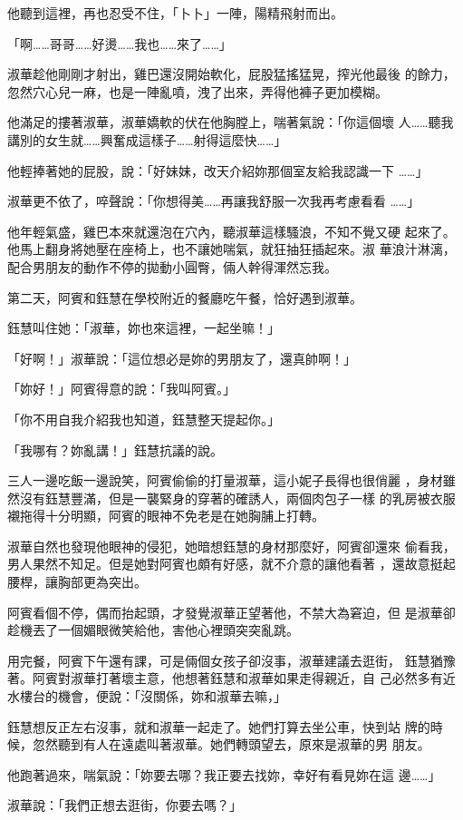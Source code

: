 他聽到這裡，再也忍受不住，「卜卜」一陣，陽精飛射而出。

「啊……哥哥……好燙……我也……來了……」

淑華趁他剛剛才射出，雞巴還沒開始軟化，屁股猛搖猛晃，搾光他最後
的餘力，忽然穴心兒一麻，也是一陣亂噴，洩了出來，弄得他褲子更加模糊。

他滿足的摟著淑華，淑華嬌軟的伏在他胸膛上，喘著氣說：「你這個壞
人……聽我講別的女生就……興奮成這樣子……射得這麼快……」

他輕捧著她的屁股，說：「好妹妹，改天介紹妳那個室友給我認識一下
……」

淑華更不依了，啐聲說：「你想得美……再讓我舒服一次我再考慮看看
……」

他年輕氣盛，雞巴本來就還泡在穴內，聽淑華這樣騷浪，不知不覺又硬
起來了。他馬上翻身將她壓在座椅上，也不讓她喘氣，就狂抽狂插起來。淑
華浪汁淋漓，配合男朋友的動作不停的拋動小圓臀，倆人幹得渾然忘我。

第二天，阿賓和鈺慧在學校附近的餐廳吃午餐，恰好遇到淑華。

鈺慧叫住她：「淑華，妳也來這裡，一起坐嘛！」

「好啊！」淑華說：「這位想必是妳的男朋友了，還真帥啊！」

「妳好！」阿賓得意的說：「我叫阿賓。」

「你不用自我介紹我也知道，鈺慧整天提起你。」

「我哪有？妳亂講！」鈺慧抗議的說。

三人一邊吃飯一邊說笑，阿賓偷偷的打量淑華，這小妮子長得也很俏麗
，身材雖然沒有鈺慧豐滿，但是一襲緊身的穿著的確誘人，兩個肉包子一樣
的乳房被衣服襯拖得十分明顯，阿賓的眼神不免老是在她胸脯上打轉。

淑華自然也發現他眼神的侵犯，她暗想鈺慧的身材那麼好，阿賓卻還來
偷看我，男人果然不知足。但是她對阿賓也頗有好感，就不介意的讓他看著
，還故意挺起腰桿，讓胸部更為突出。

阿賓看個不停，偶而抬起頭，才發覺淑華正望著他，不禁大為窘迫，但
是淑華卻趁機丟了一個媚眼微笑給他，害他心裡頭突突亂跳。

用完餐，阿賓下午還有課，可是倆個女孩子卻沒事，淑華建議去逛街，
鈺慧猶豫著。阿賓對淑華打著壞主意，他想著鈺慧和淑華如果走得親近，自
己必然多有近水樓台的機會，便說：「沒關係，妳和淑華去嘛，」

鈺慧想反正左右沒事，就和淑華一起走了。她們打算去坐公車，快到站
牌的時候，忽然聽到有人在遠處叫著淑華。她們轉頭望去，原來是淑華的男
朋友。

他跑著過來，喘氣說：「妳要去哪？我正要去找妳，幸好有看見妳在這
邊……」

淑華說：「我們正想去逛街，你要去嗎？」

